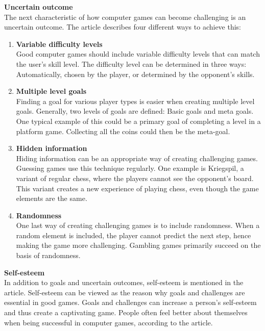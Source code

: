 \documentclass[../Main.tex]{subfiles}
\begin{document}
\textbf{Uncertain outcome} \\
The next characteristic of how computer games can become challenging is an uncertain outcome. The article describes four different ways to achieve this:

\begin{enumerate}
    \item \textbf{Variable difficulty levels}\\ 
    Good computer games should include variable difficulty levels that can match the user’s skill level. The difficulty level can be determined in three ways: Automatically, chosen by the player, or determined by the opponent’s skills.

    \item \textbf{Multiple level goals} \\ 
    Finding a goal for various player types is easier when creating multiple level goals. Generally, two levels of goals are defined: Basic goals and meta goals. One typical example of this could be a primary goal of completing a level in a platform game. Collecting all the coins could then be the meta-goal. 

    \item \textbf{Hidden information} \\
    Hiding information can be an appropriate way of creating challenging games. Guessing games use this technique regularly. One example is Kriegspil, a variant of regular chess, where the players cannot see the opponent's board. This variant creates a new experience of playing chess, even though the game elements are the same.

    \item \textbf{Randomness} \\
    One last way of creating challenging games is to include randomness. When a random element is included, the player cannot predict the next step, hence making the game more challenging. Gambling games primarily succeed on the basis of randomness.
\end{enumerate}

\textbf{Self-esteem} \\
In addition to goals and uncertain outcomes, self-esteem is mentioned in the article. Self-esteem can be viewed as the reason why goals and challenges are essential in good games. Goals and challenges can increase a person’s self-esteem and thus create a captivating game. People often feel better about themselves when being successful in computer games, according to the article.
\end{document}
